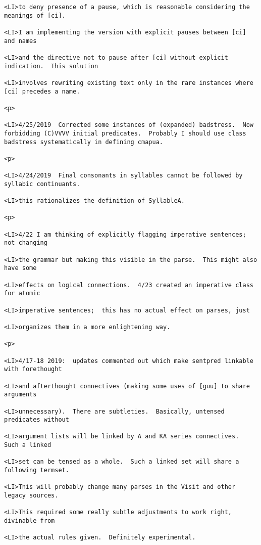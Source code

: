\documentclass[12pt]{article}
\begin{document}
\begin{lstlisting}
<LI>to deny presence of a pause, which is reasonable considering the meanings of [ci].

<LI>I am implementing the version with explicit pauses between [ci] and names

<LI>and the directive not to pause after [ci] without explicit indication.  This solution

<LI>involves rewriting existing text only in the rare instances where [ci] precedes a name.

<p>

<LI>4/25/2019  Corrected some instances of (expanded) badstress.  Now forbidding (C)VVVV initial predicates.  Probably I should use class badstress systematically in defining cmapua.

<p>

<LI>4/24/2019  Final consonants in syllables cannot be followed by syllabic continuants.

<LI>this rationalizes the definition of SyllableA.

<p>

<LI>4/22 I am thinking of explicitly flagging imperative sentences;  not changing

<LI>the grammar but making this visible in the parse.  This might also have some

<LI>effects on logical connections.  4/23 created an imperative class for atomic

<LI>imperative sentences;  this has no actual effect on parses, just

<LI>organizes them in a more enlightening way.

<p>

<LI>4/17-18 2019:  updates commented out which make sentpred linkable with forethought

<LI>and afterthought connectives (making some uses of [guu] to share arguments

<LI>unnecessary).  There are subtleties.  Basically, untensed predicates without

<LI>argument lists will be linked by A and KA series connectives.  Such a linked

<LI>set can be tensed as a whole.  Such a linked set will share a following termset.

<LI>This will probably change many parses in the Visit and other legacy sources.

<LI>This required some really subtle adjustments to work right, divinable from

<LI>the actual rules given.  Definitely experimental.


\end{lstlisting}
\end{document}
